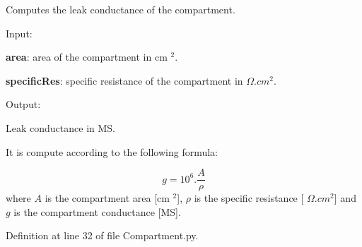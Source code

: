 Computes the leak conductance of the compartment. 


\begin{DoxyItemize}
\item Input\-:
\begin{DoxyItemize}
\item {\bfseries area}\-: area of the compartment in cm $^2$.
\item {\bfseries specific\-Res}\-: specific resistance of the compartment in $\Omega.cm^2$.
\end{DoxyItemize}
\item Output\-:
\begin{DoxyItemize}
\item Leak conductance in M\-S.
\end{DoxyItemize}
\end{DoxyItemize}

It is compute according to the following formula\-:

\begin{equation} g = 10^6 . \frac{A}{\rho} \end{equation} where $A$ is the compartment area \mbox{[}cm $^2$\mbox{]}, $\rho$ is the specific resistance \mbox{[} $\Omega.cm^2$\mbox{]} and $g$ is the compartment conductance \mbox{[}M\-S\mbox{]}. 

Definition at line 32 of file Compartment.\-py.


